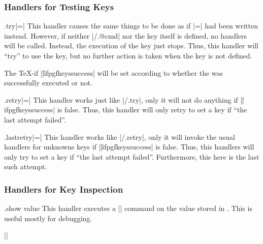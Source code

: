 \subsubsection{Handlers for Testing Keys}

\begin{handler}{{.try}|=|}
  This handler causes the same things to be done as if
  |=| had been written instead. However, if
  neither |/.@cmd| nor the key itself is defined, no
  handlers will be called. Instead, 
  the execution of the key just stops. Thus, this handler will ``try''
  to use the key, but no further action is taken when the key is not
  defined.

  The \TeX-if |\||ifpgfkeyssuccess| will be set according to whether
  the  was successfully executed or not. 
\begin{codeexample}[]
\end{codeexample}
\end{handler}

\begin{handler}{{.retry}|=|}
  This handler works just like |/.try|, only it will not do anything if
  |\||ifpgfkeyssuccess| is false. Thus, this handler will only retry
  to set a key if ``the last attempt failed''. 
\begin{codeexample}[]
\end{codeexample}
\end{handler}

\begin{handler}{{.lastretry}|=|}
	This handler works like |/.retry|, only it will invoke the usual handlers for unknowns keys if |\||ifpgfkeyssuccess| is false. Thus, this handlers will only try to set a key if ``the last attempt failed''. Furthermore, this here is the last such attempt.
\end{handler}


\subsubsection{Handlers for Key Inspection}

\begin{handler}{{.show value}}
  This handler executes a |\show| command on the value stored in
  . This is useful mostly for debugging.

  \example ||
\end{handler}

